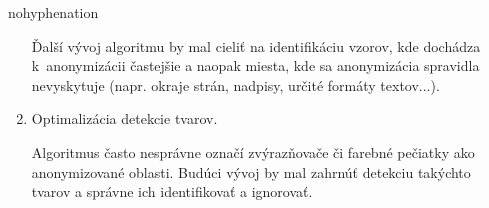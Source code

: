 \begin{hyphenrules}{nohyphenation}
\begin{enumerate}
    Ďalší vývoj algoritmu by mal cieliť na identifikáciu vzorov, kde dochádza k~anonymizácii častejšie a naopak miesta, kde sa anonymizácia spravidla nevyskytuje (napr. okraje strán, nadpisy, určité formáty textov...).

    \item Optimalizácia detekcie tvarov.

    Algoritmus často nesprávne označí zvýrazňovače či farebné pečiatky ako anonymizované oblasti. Budúci vývoj by mal zahrnúť detekciu takýchto tvarov a správne ich identifikovať a ignorovať.
\end{enumerate}
\end{hyphenrules}
